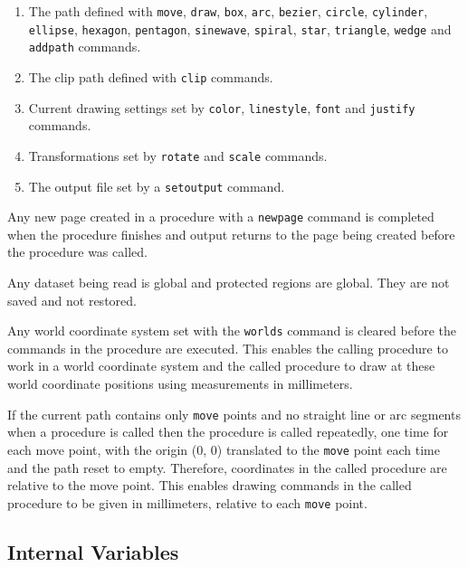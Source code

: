 \begin{enumerate}
\item
The path defined with
\texttt{move},
\texttt{draw},
\texttt{box},
\texttt{arc},
\texttt{bezier},
\texttt{circle},
\texttt{cylinder},
\texttt{ellipse},
\texttt{hexagon},
\texttt{pentagon},
\texttt{sinewave},
\texttt{spiral},
\texttt{star},
\texttt{triangle},
\texttt{wedge}
and
\texttt{addpath}
commands.

\item
The clip path defined with
\texttt{clip} commands.

\item
Current drawing settings set by
\texttt{color},
\texttt{linestyle},
\texttt{font} and \texttt{justify}
commands.

\item
Transformations set by \texttt{rotate} and \texttt{scale} commands.

\item
The output file set by a \texttt{setoutput} command.
\end{enumerate}

Any new page created in a procedure with a
\texttt{newpage}
command is completed when the procedure finishes and output
returns to the page being created before the procedure was called.

Any dataset being read is global and protected regions are global.
They are not saved and not restored.

Any world coordinate system set with the \texttt{worlds} command is cleared
before the commands in the procedure are executed.  This enables the calling
procedure to work in a world coordinate system and the called procedure to draw
at these world coordinate positions using measurements in millimeters.

If the current path contains only \texttt{move} points and no straight line or
arc segments when a procedure is called then the procedure is called
repeatedly, one time for each move point, with the origin (0, 0) translated to
the \texttt{move} point each time and the path reset to empty.  Therefore,
coordinates in the called procedure are relative to the move point.  This
enables drawing commands in the called procedure to be given in millimeters,
relative to each \texttt{move} point.

\subsection{Internal Variables}

